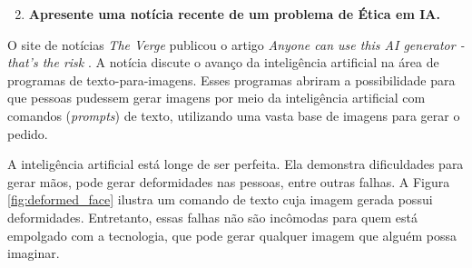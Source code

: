 \begin{enumerate}\setcounter{enumi}{1}\bfseries
    \item \textbf{Apresente uma notícia recente de um problema de Ética em IA.}
\end{enumerate}

O site de notícias \textit{The Verge} publicou o artigo \textit{Anyone can use this AI generator - that's the risk} \cite{verge_ai_generator}. A notícia discute o avanço da inteligência artificial na área de programas de texto-para-imagens. Esses programas abriram a possibilidade para que pessoas pudessem gerar imagens por meio da inteligência artificial com comandos (\textit{prompts}) de texto, utilizando uma vasta base de imagens para gerar o pedido.



A inteligência artificial está longe de ser perfeita. Ela demonstra dificuldades para gerar mãos, pode gerar deformidades nas pessoas, entre outras falhas. A Figura \ref{fig:deformed_face} ilustra um comando de texto cuja imagem gerada possui deformidades. Entretanto, essas falhas não são incômodas para quem está empolgado com a tecnologia, que pode gerar qualquer imagem que alguém possa imaginar.


